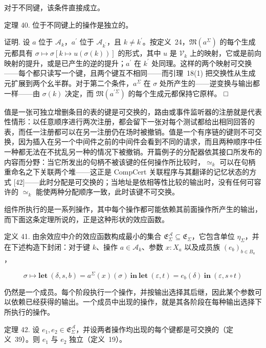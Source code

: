 对于不同键，该条件直接成立。

定理 40. 位于不同键上的操作是独立的。

证明. 设 \(a\) 位于 \(\mathcal { A } _ { k }\)，\(a ^ { \prime }\) 位于 \(\mathcal { A } _ { k ^ { \prime } }\)，且 \(k \neq k ^ { \prime }\)。按定义~24，\(\mathfrak { M } ( a ^ { \Sigma } )\) 的每个生成元都具有 \(\sigma \mapsto \sigma [ k \mapsto u ( \sigma ( k ) ) ]\) 的形式，其中 \(u\) 是 \(\mathcal { V } _ { k }\) 上的映射，它或是前向映射的提升，或是已产生的逆的提升；\(a ^ { \prime }\) 在 \(k ^ { \prime }\) 处同理。这样的两个映射可交换——每个都只读写一个键，且两个键互不相同——而引理~18(1) 把交换性从生成元扩展到两个幺半群。对于第二个条件，\(a ^ { \Sigma }\) 在 \(\sigma\) 处所产生的——逆变换与输出都一样——由 \(\sigma ( k )\) 决定，而 \(\mathfrak { M } ( a ^ { \prime \Sigma } )\) 的每个生成元都保持它原样。 □

值是一张可独立增删条目的表的键是可交换的，路由或事件监听器的注册就是代表性情形：以任意顺序进行两次注册，都会留下一张对每个测试都给出相同回答的表，而任一注册都可以在另一注册仍在场时被撤销。值是一个有序链的键则不可交换，因为插入在另一个中间件之前的中间件会看到不同的请求，而且两种顺序中任一种都无法在不扰乱另一种的情况下被撤销。开篇例子的分配器依其接口所发布的内容而分野：当它所发出的句柄不被该键的任何操作所比较时，\(\simeq _ { k }\) 可以在句柄重命名之下关联两个堆——这正是 CompCert 关联程序与其翻译的记忆状态的方式 [42]——此时分配是可交换的；当地址是依相等性比较的输出时，没有任何可容许的 \(\simeq _ { k }\) 能使两种分配顺序一致，此时该键不可交换。

组件所执行的是一系列操作，其中每个操作都可能依赖其前面操作所产生的输出，而下面这条定理所说的，正是这种形状的效应函数。

定义 41. 由余效应中介的效应函数构成最小的集合 \(\mathfrak { E } _ { \Sigma } ^ { \mathcal { A } } \subseteq \mathfrak { E } _ { \Sigma }\)，它包含单位 \(\eta _ { \Sigma }\)，并在下述构造下封闭：对于键 \(k\)、操作 \(a \in \mathcal { A } _ { k }\)、参数 \(x : X _ { a }\) 以及成员族 \(( e _ { b } ) _ { b \in B _ { a } }\)，

\[
\sigma \mapsto \mathbf { l e t } ~ ( \delta , s , b ) = a ^ { \Sigma } ( x ) ( \sigma ) \ \mathbf { i n } \ \mathbf { l e t } ~ ( \varepsilon , t ) = e _ { b } ( \delta ) \ \mathbf { i n } ~ ( \varepsilon , s \circ t )\tag{36}
\]

仍然是一个成员。每个阶段执行一个操作，并按输出选择其后继，因此某个参数可以依赖已经获得的输出。一个成员中出现的操作，就是其各阶段在每种输出选择下所执行的操作。

定理 42. 设 \(e _ { 1 } , e _ { 2 } \in \mathfrak { E } _ { \Sigma } ^ { \mathcal { A } }\)，并设两者操作均出现的每个键都是可交换的（定义~39）。则 \(e _ { 1 }\) 与 \(e _ { 2 }\) 独立（定义~19）。

